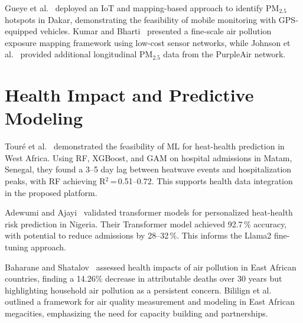 Gueye et al.~\cite{Ahmed_Gueye_2023} deployed an IoT and mapping-based approach to identify PM$_{2.5}$ hotspots in Dakar, demonstrating the feasibility of mobile monitoring with GPS-equipped vehicles. Kumar and Bharti~\cite{Kumar_Sunil_2025} presented a fine-scale air pollution exposure mapping framework using low-cost sensor networks, while Johnson et al.~\cite{Johnson_Olatunji_2022} provided additional longitudinal PM$_{2.5}$ data from the PurpleAir network.

\section{Health Impact and Predictive Modeling}
Touré et al.~\cite{toure2024} demonstrated the feasibility of ML for heat-health prediction in West Africa. Using RF, XGBoost, and GAM on hospital admissions in Matam, Senegal, they found a 3--5 day lag between heatwave events and hospitalization peaks, with RF achieving R$^2$\,=\,0.51--0.72. This supports health data integration in the proposed platform.

Adewumi and Ajayi~\cite{adewumi2025} validated transformer models for personalized heat-health risk prediction in Nigeria. Their Transformer model achieved 92.7\,\% accuracy, with potential to reduce admissions by 28--32\,\%. This informs the Llama2 fine-tuning approach.

Baharane and Shatalov~\cite{Valérien_Baharane_2024} assessed health impacts of air pollution in East African countries, finding a 14.26\% decrease in attributable deaths over 30 years but highlighting household air pollution as a persistent concern. Bililign et al.~\cite{Solomon_Bililign_2024} outlined a framework for air quality measurement and modeling in East African megacities, emphasizing the need for capacity building and partnerships.

